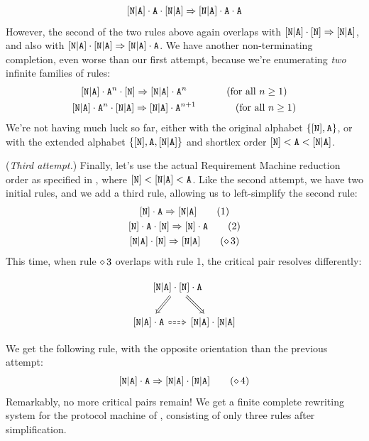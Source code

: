 \documentclass[../generics]{subfiles}
\begin{document}
\begin{example}
\begin{gather*}
[\texttt{N}|\texttt{A}]\cdot\texttt{A}\cdot[\texttt{N}|\texttt{A}] \Rightarrow [\texttt{N}|\texttt{A}]\cdot\texttt{A}\cdot\texttt{A}
\end{gather*}
However, the second of the two rules above again overlaps with $[\texttt{N}|\texttt{A}] \cdot [\texttt{N}] \Rightarrow [\texttt{N}|\texttt{A}]$, and also with $[\texttt{N}|\texttt{A}] \cdot [\texttt{N}|\texttt{A}] \Rightarrow [\texttt{N}|\texttt{A}] \cdot \texttt{A}$. We have another non-terminating completion, even worse than our first attempt, because we're enumerating \emph{two} infinite families of rules:
\begin{gather*}
\ProtoConf{\aNA \cdot \nA^n}{N} \qquad \tag{for all $n \geq 1$} \\
\aNA \cdot \nA^n \cdot \aNA \Red \aNA \cdot \nA^{n+1} \qquad \tag{for all $n \geq 1$}
\end{gather*}
We're not having much luck so far, either with the original alphabet $\{[\texttt{N}],\texttt{A}\}$, or with the extended alphabet $\{[\texttt{N}],\texttt{A},[\texttt{N}|\texttt{A}]\}$ and shortlex order $[\texttt{N}] < \texttt{A} < [\texttt{N}|\texttt{A}]$.

\smallskip

(\emph{Third attempt.})
Finally, let's use the actual Requirement Machine reduction order as specified in , where $[\texttt{N}] < [\texttt{N}|\texttt{A}] < \texttt{A}$. Like the second attempt, we have two initial rules, and we add a third rule, allowing us to left-simplify the second rule:
\begin{gather*}
\AssocIntro{N}{A}\tag{1}\\
\ProtoConf{\pN\cdot\nA}{N}\tag{2}\\
\ProtoConf{\aNA}{N}\tag{$\CRule{3}$}
\end{gather*}
This time, when rule $\diamond\, 3$ overlaps with rule 1, the critical pair resolves differently:
\begin{ceqn}
\[
\begin{tikzcd}[column sep=-2em]
&\aNA\cdot\pN\cdot\nA\arrow[ld, Rightarrow]\arrow[rd, Rightarrow]\\
\aNA\cdot\nA\arrow[rr, Rightarrow, dashed] && \aNA\cdot\aNA
\end{tikzcd}
\]
\end{ceqn}
We get the following rule, with the opposite orientation than the previous attempt:
\[
\aNA\cdot\nA\Red\aNA\cdot\aNA\tag{$\CRule{4}$}
\]
Remarkably, no more critical pairs remain! We get a finite complete rewriting system for the protocol machine of \tN, consisting of only three rules after simplification.


\end{example}
\end{document}
